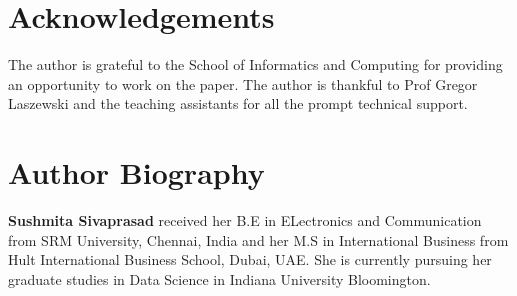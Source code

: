 \documentclass[9pt,twocolumn,twoside]{../../styles/osajnl}
\begin{document}
\section*{Acknowledgements}
The author is grateful to the School of Informatics and Computing for
providing an opportunity to work on the paper. The author is thankful
to Prof Gregor Laszewski and the teaching assistants for all the
prompt technical support.



\section{Author Biography}

{\bfseries Sushmita Sivaprasad} received her B.E in ELectronics and
Communication from SRM University, Chennai, India and her M.S in
International Business from Hult International Business School, Dubai,
UAE. She is currently pursuing her graduate studies in Data Science in
Indiana University Bloomington.
\end{document}
